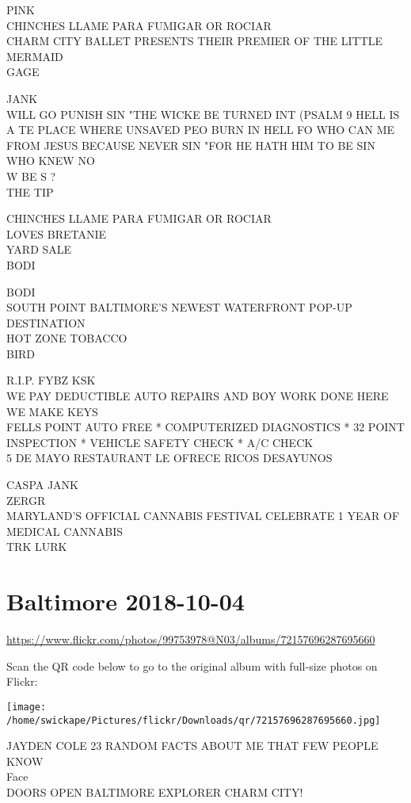 \documentclass[10pt,letterpaper]{article}
\begin{document}
PINK\\
CHINCHES LLAME PARA FUMIGAR OR ROCIAR\\
CHARM CITY BALLET PRESENTS THEIR PREMIER OF THE LITTLE MERMAID\\
GAGE

JANK\\
WILL GO PUNISH SIN "THE WICKE BE TURNED INT (PSALM 9 HELL IS A TE PLACE WHERE UNSAVED PEO BURN IN HELL FO WHO CAN ME FROM JESUS BECAUSE NEVER SIN "FOR HE HATH HIM TO BE SIN WHO KNEW NO\\
W BE S ?\\
THE TIP

CHINCHES LLAME PARA FUMIGAR OR ROCIAR\\
LOVES BRETANIE\\
YARD SALE\\
BODI

BODI\\
SOUTH POINT BALTIMORE'S NEWEST WATERFRONT POP{-}UP DESTINATION\\
HOT ZONE TOBACCO\\
BIRD

R.I.P. FYBZ KSK\\
WE PAY DEDUCTIBLE AUTO REPAIRS AND BOY WORK DONE HERE WE MAKE KEYS\\
FELLS POINT AUTO FREE * COMPUTERIZED DIAGNOSTICS * 32 POINT INSPECTION * VEHICLE SAFETY CHECK * A/C CHECK\\
5 DE MAYO RESTAURANT LE OFRECE RICOS DESAYUNOS

CASPA JANK\\
ZERGR\\
MARYLAND'S OFFICIAL CANNABIS FESTIVAL CELEBRATE 1 YEAR OF MEDICAL CANNABIS\\
TRK LURK


\section*{Baltimore 2018-10-04}

\url{https://www.flickr.com/photos/99753978@N03/albums/72157696287695660}

Scan the QR code below to go to the original album with full-size photos on Flickr:

\texttt{[image: /home/swickape/Pictures/flickr/Downloads/qr/72157696287695660.jpg]}


JAYDEN COLE 23 RANDOM FACTS ABOUT ME THAT FEW PEOPLE KNOW\\
Face\\
DOORS OPEN BALTIMORE EXPLORER CHARM CITY!
\end{document}
